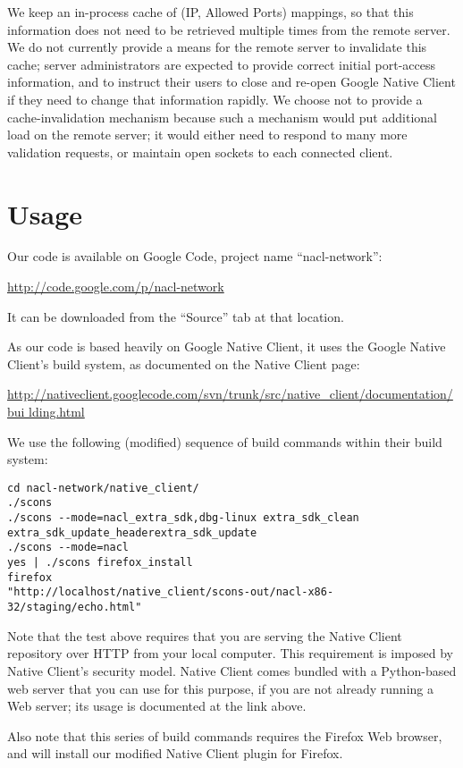 \documentclass[a4paper,10pt]{article}
\begin{document}
We keep an in-process cache of (IP, Allowed Ports) mappings, so that this
information does not need to be retrieved multiple times from the remote
server.  We do not currently provide a means for the remote server to
invalidate this cache; server administrators are expected to provide correct
initial port-access information, and to instruct their users to close and
re-open Google Native Client if they need to change that information rapidly.
We choose not to provide a cache-invalidation mechanism because such a
mechanism would put additional load on the remote server; it would either need
to respond to many more validation requests, or maintain open sockets to each
connected client.

\section{Usage}

Our code is available on Google Code, project name ``nacl-network'':

\url{http://code.google.com/p/nacl-network}

It can be downloaded from the ``Source'' tab at that location.

As our code is based heavily on Google Native Client, it uses the Google Native
Client's build system, as documented on the Native Client page:

\url{
http://nativeclient.googlecode.com/svn/trunk/src/native_client/documentation/bui
lding.html}

We use the following (modified) sequence of build commands within their build
system:

\begin{verbatim}
cd nacl-network/native_client/
./scons
./scons --mode=nacl_extra_sdk,dbg-linux extra_sdk_clean
extra_sdk_update_headerextra_sdk_update
./scons --mode=nacl
yes | ./scons firefox_install
firefox
"http://localhost/native_client/scons-out/nacl-x86-32/staging/echo.html"
\end{verbatim}

Note that the test above requires that you are serving the Native Client
repository over HTTP from your local computer.  This requirement is imposed
by Native Client's security model.  Native Client comes bundled with a
Python-based web server that you can use for this purpose, if you are not
already running a Web server; its usage is documented at the link above.

Also note that this series of build commands requires the Firefox Web browser,
and will install our modified Native Client plugin for Firefox.
\end{document}

